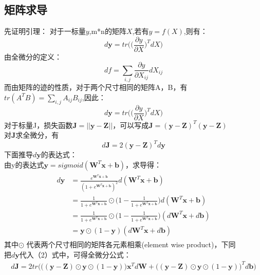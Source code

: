 \documentclass{article}
\begin{document}
\subsection{矩阵求导}
先证明引理：
对于一标量$y$,m*n的矩阵$X$,若有$y=f(X)$,则有：
\begin{equation}
    d\mathbf{y}=tr\Big(\big(\frac{\partial y}{\partial X}\big)^TdX\Big)
\end{equation}
由全微分的定义：
\begin{equation*}
    df = \sum_{i,j}\frac{\partial y}{\partial X_{ij}}dX_{ij}
\end{equation*}
而由矩阵的迹的性质，对于两个尺寸相同的矩阵A，B，有$tr(A^TB)=\sum_{i,j}A_{ij}B_{ij}$,因此：
\begin{equation}
d\mathbf{y}=tr\Big(\big(\frac{\partial y}{\partial X}\big)^TdX\Big)
\end{equation}
对于标量J，损失函数$\mathbf{J}=||\mathbf{y}-\mathbf{Z}||$，可以写成$\mathbf{J}=(\mathbf{y}-\mathbf{Z})^T(\mathbf{y}-\mathbf{Z})$\\
对$\mathbf{J}$求全微分，有
\begin{equation}
    d\mathbf{J} = 2(\mathbf{y}-\mathbf{Z})^Td\mathbf{y}
\end{equation}
下面推导$d\mathbf{y}$的表达式：\\
由y的表达式$\mathbf{y}=sigmoid(\mathbf{W}^T\mathbf{x}+\mathbf{b})$，求导得：
\begin{eqnarray*}
    \begin{aligned}
    d\mathbf{y}&=\frac{e^{\mathbf{W}^T\mathbf{x}+\mathbf{b}}}{(1+e^{\mathbf{W}^T\mathbf{x}+\mathbf{b}})^2}d(\mathbf{W}^T\mathbf{x}+\mathbf{b})\\
     &= \frac{1}{1+e^{\mathbf{W}^T\mathbf{x}+\mathbf{b}}}\odot\biggr(1-\frac{1}{1+e^{\mathbf{W}^T\mathbf{x}+\mathbf{b}}}\biggr)d(\mathbf{W}^T\mathbf{x}+\mathbf{b})\\
     &= \frac{1}{1+e^{\mathbf{W}^T\mathbf{x}+\mathbf{b}}}\odot\biggr(1-\frac{1}{1+e^{\mathbf{W}^T\mathbf{x}+\mathbf{b}}}\biggr)(d\mathbf{W}^T\mathbf{x}+d\mathbf{b})\\
     &= \mathbf{y}\odot(1-\mathbf{y})(d\mathbf{W}^T\mathbf{x}+d\mathbf{b})
    \end{aligned}
\end{eqnarray*}
其中$\odot$ 代表两个尺寸相同的矩阵各元素相乘(element wise product)，下同\\
把$d\mathbf{y}$代入（2）式中，可得全微分公式：
\begin{eqnarray*}
    d\mathbf{J}=2tr\Big(\big((\mathbf{y}-\mathbf{Z})\odot\mathbf{y}\odot(1-\mathbf{y})\big)\mathbf{x}^Td\mathbf{W}+\big((\mathbf{y}-\mathbf{Z})\odot\mathbf{y}\odot(1-\mathbf{y})\big)^Td\mathbf{b}\Big)
\end{eqnarray*}
\end{document}
